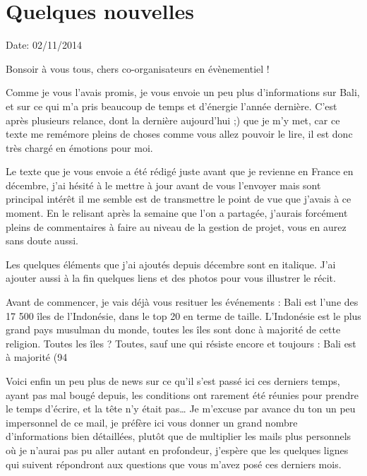 \section{Quelques nouvelles}

\par
Date: 02/11/2014

\par

\par
Bonsoir à vous tous, chers co-organisateurs en évènementiel !

\par
Comme je vous l’avais promis, je vous envoie un peu plus d’informations sur Bali, et sur ce qui m’a pris beaucoup de temps et d’énergie l’année dernière. C’est après plusieurs relance, dont la dernière aujourd’hui ;) que je m’y met, car ce texte me remémore pleins de choses comme vous allez pouvoir le lire, il est donc très chargé en émotions pour moi.

\par
Le texte que je vous envoie a été rédigé juste avant que je revienne en France en décembre, j’ai hésité à le mettre à jour avant de vous l'envoyer mais sont principal intérêt il me semble est de transmettre le point de vue que j’avais à ce moment. En le relisant après la semaine que l’on a partagée, j’aurais forcément pleins de commentaires à faire au niveau de la gestion de projet, vous en aurez sans doute aussi.

\par
Les quelques éléments que j’ai ajoutés depuis décembre sont en italique. J’ai ajouter aussi à la fin quelques liens et des photos pour vous illustrer le récit.

\par
Avant de commencer, je vais déjà vous resituer les événements : Bali est l’une des 17 500 îles de l’Indonésie, dans le top 20 en terme de taille. L’Indonésie est le plus grand pays musulman du monde, toutes les îles sont donc à majorité de cette religion. Toutes les îles ? Toutes, sauf une qui résiste encore et toujours : Bali est à majorité (94%

\par
Voici enfin un peu plus de news sur ce qu’il s’est passé ici ces derniers temps, ayant pas mal bougé depuis, les conditions ont rarement été réunies pour prendre le temps d’écrire, et la tête n’y était pas… Je m’excuse par avance du ton un peu impersonnel de ce mail, je préfère ici vous donner un grand nombre d’informations bien détaillées, plutôt que de multiplier les mails plus personnels où je n’aurai pas pu aller autant en profondeur, j’espère que les quelques lignes qui suivent répondront aux questions que vous m’avez posé ces derniers mois.

